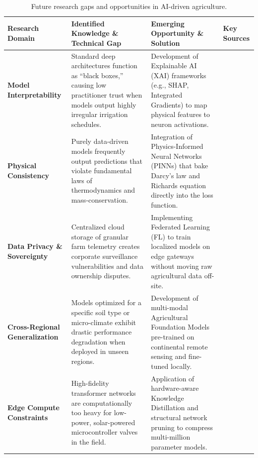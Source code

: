\documentclass[land,article,submit,pdftex,moreauthors]{Definitions/mdpi}
\numberwithin{equation}{section}
\begin{document}
\begin{longtable}{@{\extracolsep{\fill}} p{} p{} p{} p{} @{}}
\caption{Future research gaps and opportunities in AI-driven agriculture. \label{tab:future_gaps}}\\
\toprule
\textbf{Research Domain} & \textbf{Identified Knowledge \& Technical Gap} & \textbf{Emerging Opportunity \& Solution} & \textbf{Key Sources} \\
\midrule
\endhead 

\bottomrule
\endfoot 

\textbf{Model Interpretability} & 
Standard deep architectures function as ``black boxes,'' causing low practitioner trust when models output highly irregular irrigation schedules. & 
Development of Explainable AI (XAI) frameworks (e.g., SHAP, Integrated Gradients) to map physical features to neuron activations. & 
\citep{XaiAgri2025, FrontiersXai2026} \\ \hline

\textbf{Physical Consistency} & 
Purely data-driven models frequently output predictions that violate fundamental laws of thermodynamics and mass-conservation. & 
Integration of Physics-Informed Neural Networks (PINNs) that bake Darcy's law and Richards equation directly into the loss function. & 
\citep{PinnSoil2025} \\ \hline

\textbf{Data Privacy \& Sovereignty} & 
Centralized cloud storage of granular farm telemetry creates corporate surveillance vulnerabilities and data ownership disputes. & 
Implementing Federated Learning (FL) to train localized models on edge gateways without moving raw agricultural data off-site. & 
\citep{FederatedAgri2025} \\ \hline

\textbf{Cross-Regional Generalization} & 
Models optimized for a specific soil type or micro-climate exhibit drastic performance degradation when deployed in unseen regions. & 
Development of multi-modal Agricultural Foundation Models pre-trained on continental remote sensing and fine-tuned locally. & 
\citep{FoundationAgri2026} \\ \hline

\textbf{Edge Compute Constraints} & 
High-fidelity transformer networks are computationally too heavy for low-power, solar-powered microcontroller valves in the field. & 
Application of hardware-aware Knowledge Distillation and structural network pruning to compress multi-million parameter models. & 
\citep{EdgePruning2025, LowPowerIo2026} \\

\end{longtable}
\normalsize
\end{document}

